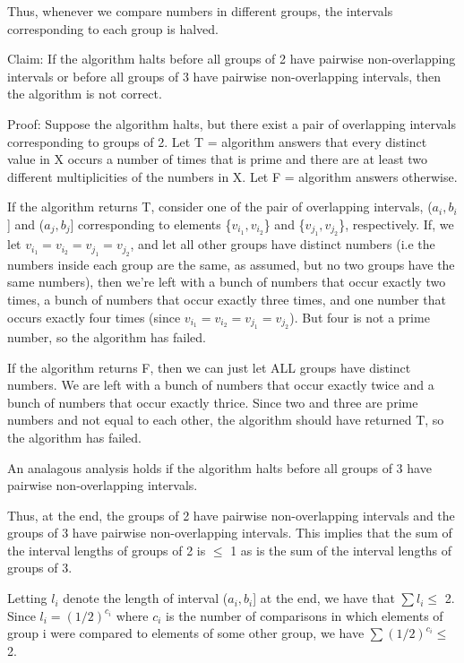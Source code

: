 \documentclass[11pt,a4paper]{article}
\begin{document}
Thus, whenever we compare numbers in different groups, the intervals corresponding to each group is halved.  \newline

Claim: If the algorithm halts before all groups of 2 have pairwise non-overlapping intervals or before all groups of 3 have pairwise non-overlapping intervals, then the algorithm is not correct. 

Proof: Suppose the algorithm halts, but there exist a pair of overlapping intervals corresponding to groups of 2. Let T = algorithm answers that every distinct value in X occurs a number of times that is prime and there are at least two different multiplicities of the numbers in X. Let F = algorithm answers otherwise. 

If the algorithm returns T, consider one of the pair of overlapping intervals, ($a_{i}, b_{i}$] and ($a_{j}, b_{j}$] corresponding to elements \{$v_{i_{1}}, v_{i_{2}}$\} and \{$v_{j_{1}}, v_{j_{2}}$\}, respectively. If, we let $v_{i_{1}} = v_{i_{2}} = v_{j_{1}} = v_{j_{2}}$, and let all other groups have distinct numbers (i.e the numbers inside each group are the same, as assumed, but no two groups have the same numbers), then we're left with a bunch of numbers that occur exactly two times, a bunch of numbers that occur exactly three times, and one number that occurs exactly four times (since $v_{i_{1}} = v_{i_{2}} = v_{j_{1}} = v_{j_{2}}$). But four is not a prime number, so the algorithm has failed. 

If the algorithm returns F, then we can just let ALL groups have distinct numbers. We are left with a bunch of numbers that occur exactly twice and a bunch of numbers that occur exactly thrice. Since two and three are prime numbers and not equal to each other, the algorithm should have returned T, so the algorithm has failed. 

An analagous analysis holds if the algorithm halts before all groups of 3 have pairwise non-overlapping intervals. \newline

Thus, at the end, the groups of 2 have pairwise non-overlapping intervals and the groups of 3 have pairwise non-overlapping intervals. This implies that the sum of the interval lengths of groups of 2 is $\leq$ 1 as is the sum of the interval lengths of groups of 3.

Letting $l_{i}$ denote the length of interval ($a_{i}, b_{i}$] at the end, we have that 
$\sum l_{i} \leq$ 2. Since $l_{i} = (1/2)^{c_{i}}$ where $c_{i}$ is the number of comparisons in which elements of group i were compared to elements of some other group, we have $\sum (1/2)^{c_{i}} \leq$ 2.
\end{document}
